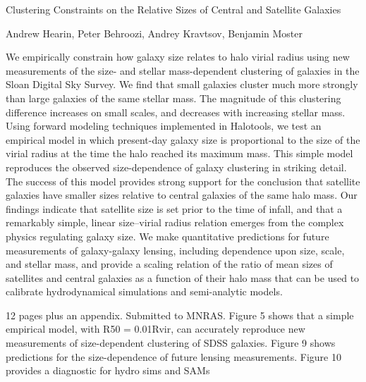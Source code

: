 Clustering Constraints on the Relative Sizes of Central and Satellite Galaxies

Andrew Hearin, Peter Behroozi, Andrey Kravtsov, Benjamin Moster

We empirically constrain how galaxy size relates to halo virial radius using new measurements of the size- and stellar mass-dependent clustering of galaxies in the Sloan Digital Sky Survey.  We find that small galaxies cluster much more strongly than large galaxies of the same stellar mass. The magnitude of this clustering difference increases on small scales, and decreases with increasing stellar mass. Using forward modeling techniques implemented in Halotools, we test an empirical model in which present-day galaxy size is proportional to the size of the virial radius at the time the halo reached its maximum mass. This simple model reproduces the observed size-dependence of galaxy clustering in striking detail. The success of this model provides strong support for the conclusion that satellite galaxies have smaller sizes relative to central galaxies of the same halo mass. Our findings indicate that satellite size is set prior to the time of infall, and that a remarkably simple, linear size--virial radius relation emerges from the complex physics regulating galaxy size. We make quantitative predictions for future measurements of galaxy-galaxy lensing, including dependence upon size, scale, and stellar mass, and provide a scaling relation of the ratio of mean sizes of satellites and central galaxies as a function of their halo mass that can be used to calibrate hydrodynamical simulations and semi-analytic models.


12 pages plus an appendix. Submitted to MNRAS.
Figure 5 shows that a simple empirical model, with R50 = 0.01Rvir, can accurately reproduce new measurements of size-dependent clustering of SDSS galaxies. Figure 9 shows predictions for the size-dependence of future lensing measurements. Figure 10 provides a diagnostic for hydro sims and SAMs



